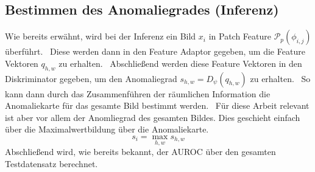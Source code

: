 \subsection{Bestimmen des Anomaliegrades (Inferenz)}\label{subsec:SimpleNet-Inferenz}
Wie bereits erwähnt, wird bei der Inferenz ein Bild $x_{i}$ in Patch Feature $\mathcal{P}_{p}\left(\phi_{i,j}\right)$ überführt. \
Diese werden dann in den Feature Adaptor gegeben, um die Feature Vektoren $q_{h,w}$ zu erhalten. \
Abschließend werden diese Feature Vektoren in den Diskriminator gegeben, um den Anomaliegrad $s_{h,w}=D_{\psi}(q_{h,w})$ zu erhalten. \
So kann dann durch das Zusammenführen der räumlichen Information die Anomaliekarte für das gesamte Bild bestimmt werden. \
Für diese Arbeit relevant ist aber vor allem der Anomliegrad des gesamten Bildes. Dies geschieht einfach über die Maximalwertbildung über die Anomaliekarte. \
$$
s_{i} = \max_{h,w} s_{h,w}
$$
Abschließend wird, wie bereits bekannt, der AUROC über den gesamten Testdatensatz berechnet. \\
